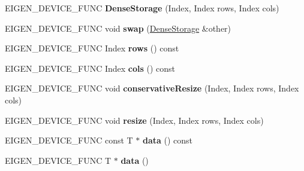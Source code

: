 \begin{DoxyCompactItemize}
E\+I\+G\+E\+N\+\_\+\+D\+E\+V\+I\+C\+E\+\_\+\+F\+U\+NC {\bfseries Dense\+Storage} (Index, Index rows, Index cols)
\item 
\mbox{\label{class_eigen_1_1_dense_storage_3_01_t_00_01_size_00_01_dynamic_00_01_dynamic_00_01___options_01_4_a2c73e53b49a8591efc5371b1721cb2cb}} 
E\+I\+G\+E\+N\+\_\+\+D\+E\+V\+I\+C\+E\+\_\+\+F\+U\+NC void {\bfseries swap} (\mbox{\hyperlink{class_eigen_1_1_dense_storage}{Dense\+Storage}} \&other)
\item 
\mbox{\label{class_eigen_1_1_dense_storage_3_01_t_00_01_size_00_01_dynamic_00_01_dynamic_00_01___options_01_4_a79f8255126db1227c8d3544559f8049b}} 
E\+I\+G\+E\+N\+\_\+\+D\+E\+V\+I\+C\+E\+\_\+\+F\+U\+NC Index {\bfseries rows} () const
\item 
\mbox{\label{class_eigen_1_1_dense_storage_3_01_t_00_01_size_00_01_dynamic_00_01_dynamic_00_01___options_01_4_aecaafabb564f4d2b64451178086a7fb6}} 
E\+I\+G\+E\+N\+\_\+\+D\+E\+V\+I\+C\+E\+\_\+\+F\+U\+NC Index {\bfseries cols} () const
\item 
\mbox{\label{class_eigen_1_1_dense_storage_3_01_t_00_01_size_00_01_dynamic_00_01_dynamic_00_01___options_01_4_a078a3fe60d23a8202d7c000700764d83}} 
E\+I\+G\+E\+N\+\_\+\+D\+E\+V\+I\+C\+E\+\_\+\+F\+U\+NC void {\bfseries conservative\+Resize} (Index, Index rows, Index cols)
\item 
\mbox{\label{class_eigen_1_1_dense_storage_3_01_t_00_01_size_00_01_dynamic_00_01_dynamic_00_01___options_01_4_acd7bb958ffd565c04bbb88653022bb79}} 
E\+I\+G\+E\+N\+\_\+\+D\+E\+V\+I\+C\+E\+\_\+\+F\+U\+NC void {\bfseries resize} (Index, Index rows, Index cols)
\item 
\mbox{\label{class_eigen_1_1_dense_storage_3_01_t_00_01_size_00_01_dynamic_00_01_dynamic_00_01___options_01_4_aa6a02a9e6a816e75e08caea69af754f7}} 
E\+I\+G\+E\+N\+\_\+\+D\+E\+V\+I\+C\+E\+\_\+\+F\+U\+NC const T $\ast$ {\bfseries data} () const
\item 
\mbox{\label{class_eigen_1_1_dense_storage_3_01_t_00_01_size_00_01_dynamic_00_01_dynamic_00_01___options_01_4_a7f444f3389dcb2e310f29f06c5163bb4}} 
E\+I\+G\+E\+N\+\_\+\+D\+E\+V\+I\+C\+E\+\_\+\+F\+U\+NC T $\ast$ {\bfseries data} ()
\end{DoxyCompactItemize}


